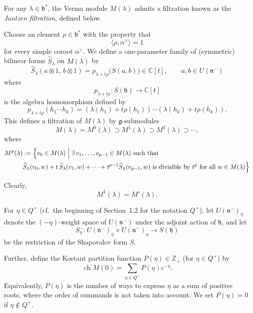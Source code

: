 \documentclass[12pt]{article}
\begin{document}
\begin{definition}
For any $\lambda \in \mathfrak{h}^*$, the Verma module $M(\lambda)$ admits a filtration
known as the \emph{Jantzen filtration}, defined below.

Choose an element $\rho \in \mathfrak{h}^*$ with the property that
\[\langle \rho, \alpha^\vee \rangle = 1\] for every simple coroot $\alpha^\vee$. We define a one-parameter family of (symmetric) bilinear forms 
$\widehat{S}_\lambda$ on $M(\lambda)$ by
\begin{equation}
\widehat{S}_\lambda(a \otimes 1,\, b \otimes 1)
= p_{\lambda + t\rho}\bigl(S(a,b)\bigr) \in \mathbb{C}[t],
\qquad a,b \in U(\mathfrak{n}^-)
\end{equation}
where 
\[
p_{\lambda + t\rho} : S(\mathfrak{h}) \longrightarrow \mathbb{C}[t]
\]
is the algebra homomorphism defined by
\[
p_{\lambda + t\rho}(h_1 \cdots h_k)
= (\lambda(h_1) + t\rho(h_1)) \cdots (\lambda(h_k) + t\rho(h_k)).
\]
This defines a filtration of $M(\lambda)$ by $\mathfrak{g}$-submodules 
\begin{equation}
M(\lambda) = M^0(\lambda) \supset M^1(\lambda) \supset M^2(\lambda) \supset \cdots,
\end{equation}
where
\begin{align*}
M^p(\lambda)
&:= \Bigl\{ v_0 \in M(\lambda) \;\Big|\;
\exists\, v_1, \dots, v_{p-1} \in M(\lambda)
\text{ such that } \\
&\widehat{S}_\lambda(v_0, w)
+ t\,\widehat{S}_\lambda(v_1, w)
+ \cdots
+ t^{p-1}\widehat{S}_\lambda(v_{p-1}, w)
\text{ is divisible by } t^p
\text{ for all } w \in M(\lambda)
\Bigr\}
\end{align*}

Clearly,
\begin{equation}
M^1(\lambda) = M'(\lambda).
\end{equation}
\end{definition}

For $\eta \in Q^+$ (cf.~the beginning of Section~1.2 for the notation $Q^+$),
let $U(\mathfrak{n}^-)_{\eta}$ denote the $(-\eta)$-weight space of $U(\mathfrak{n}^-)$
under the adjoint action of $\mathfrak{h}$, and let
\[
S^{-}_{\eta} : U(\mathfrak{n}^-)_{\eta} \times U(\mathfrak{n}^-)_{\eta}
\longrightarrow S(\mathfrak{h})
\]
be the restriction of the Shapovalov form $S$.

Further, define the Kostant partition function $P(\eta) \in \mathbb{Z}_+$ 
(for $\eta \in Q^+$) by
\[
\operatorname{ch} M(0) = \sum_{\eta \in Q^+} P(\eta)e^{-\eta}.
\]
Equivalently, $P(\eta)$ is the number of ways to express $\eta$ as a sum of
positive roots, where the order of summands is not taken into account. We set $P(\eta) = 0$ if $\eta \notin Q^+$.
\end{document}
